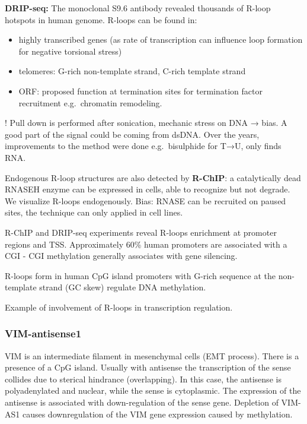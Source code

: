 \textbf{DRIP-seq:} The monoclonal S9.6 antibody revealed thousands of R-loop hotspots in human genome. R-loops can be found in:

\begin{itemize}
\tightlist
\item
  highly transcribed genes (as rate of transcription can influence loop formation for negative torsional stress)
\item
  telomeres: G-rich non-template strand, C-rich template strand
\item
  ORF: proposed function at termination sites for termination factor recruitment e.g.~chromatin remodeling.
\end{itemize}

! Pull down is performed after sonication, mechanic stress on DNA → bias. A good part of the signal could be coming from dsDNA. Over the years, improvements to the method were done e.g.~bisulphide for T→U, only finds RNA.

Endogenous R-loop structures are also detected by \textbf{R-ChIP}: a catalytically dead RNASEH enzyme can be expressed in cells, able to recognize but not degrade. We visualize R-loops endogenously. Bias: RNASE can be recruited on paused sites, the technique can only applied in cell lines.

R-ChIP and DRIP-seq experiments reveal R-loops enrichment at promoter regions and TSS. Approximately 60\% human promoters are associated with a CGI - CGI methylation generally associates with gene silencing.

R-loops form in human CpG island promoters with G-rich sequence at the non-template strand (GC skew) regulate DNA methylation.

Example of involvement of R-loops in transcription regulation.

\hypertarget{vim-antisense1}{%
\subsubsection{VIM-antisense1}\label{vim-antisense1}}

VIM is an intermediate filament in mesenchymal cells (EMT process). There is a presence of a CpG island. Usually with antisense the transcription of the sense collides due to sterical hindrance (overlapping). In this case, the antisense is polyadenylated and nuclear, while the sense is cytoplasmic. The expression of the antisense is associated with down-regulation of the sense gene. Depletion of VIM-AS1 causes downregulation of the VIM gene expression caused by methylation.

